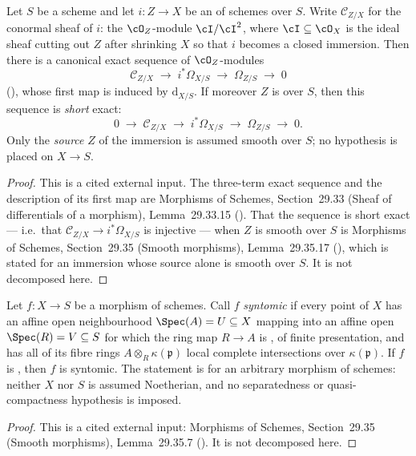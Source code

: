 \begin{lemma}
\label{lem:pc-conormal-sequence-smooth}
Let $S$ be a scheme and let $i:Z\to X$ be an
 of schemes over $S$.
Write $\mathcal C_{Z/X}$ for the conormal sheaf of $i$: the
$\cO_Z$-module $\cI/\cI^2$, where $\cI\subseteq\cO_X$ is the ideal sheaf
cutting out $Z$ after shrinking $X$ so that $i$ becomes a closed
immersion.  Then there is a canonical exact sequence of
$\cO_Z$-modules
\[
\mathcal C_{Z/X}\;\longrightarrow\;i^*\Omega_{X/S}
\;\longrightarrow\;\Omega_{Z/S}\;\longrightarrow\;0
\]
(), whose first map is induced by
$\mathrm d_{X/S}$.  If moreover $Z$ is
 over $S$, then this sequence is
\emph{short} exact:
\[
0\;\longrightarrow\;\mathcal C_{Z/X}\;\longrightarrow\;i^*\Omega_{X/S}
\;\longrightarrow\;\Omega_{Z/S}\;\longrightarrow\;0 .
\]
Only the \emph{source} $Z$ of the immersion is assumed smooth over $S$;
no hypothesis is placed on $X\to S$.
\end{lemma}
\begin{proof}
This is a cited external input.  The three-term exact sequence and the
description of its first map are Morphisms of Schemes, Section~29.33
(Sheaf of differentials of a morphism), Lemma~29.33.15
().  That the sequence is short exact --- i.e.\ that
$\mathcal C_{Z/X}\to i^*\Omega_{X/S}$ is injective --- when $Z$ is smooth
over $S$ is Morphisms of Schemes, Section~29.35 (Smooth morphisms),
Lemma~29.35.17 (), which is stated for an immersion
whose source alone is smooth over $S$.  It is not decomposed here.
\end{proof}

\begin{lemma}
\label{lem:pc-smooth-syntomic}
Let $f:X\to S$ be a morphism of schemes.  Call $f$ \emph{syntomic} if
every point of $X$ has an affine open neighbourhood $\Spec(A)=U\subseteq
X$ mapping into an affine open $\Spec(R)=V\subseteq S$ for which the ring
map $R\to A$ is , of finite
presentation, and has all of its fibre rings
$A\otimes_R\kappa(\mathfrak p)$ local complete intersections over
$\kappa(\mathfrak p)$.  If $f$ is
, then $f$ is syntomic.  The
statement is for an arbitrary morphism of schemes: neither $X$ nor $S$ is
assumed Noetherian, and no separatedness or quasi-compactness hypothesis
is imposed.
\end{lemma}
\begin{proof}
This is a cited external input: Morphisms of Schemes, Section~29.35
(Smooth morphisms), Lemma~29.35.7 ().  It is not
decomposed here.
\end{proof}

